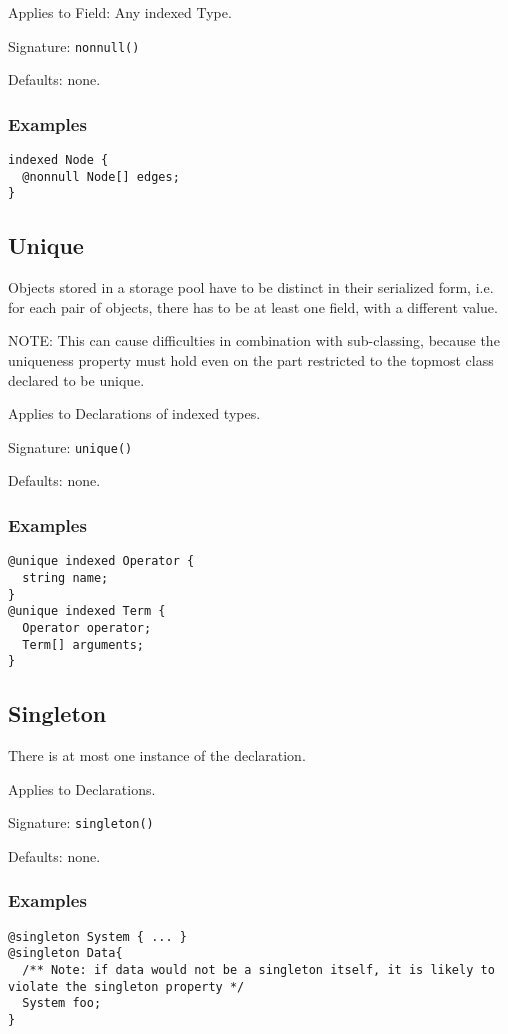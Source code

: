 \documentclass[a4paper,10pt]{article}
\begin{document}
Applies to Field: Any indexed Type.

Signature: \verb/nonnull()/

Defaults: none.

\subsubsection*{Examples}
\begin{verbatim}
indexed Node {
  @nonnull Node[] edges;
}
\end{verbatim}


\subsection*{Unique}
Objects stored in a storage pool have to be distinct in their serialized form, i.e. for each pair of objects, there has to be at least one field, with a different value.

NOTE: This can cause difficulties in combination with sub-classing, because the uniqueness property must hold even on the part restricted to the topmost class declared to be unique.

Applies to Declarations of indexed types.

Signature: \verb/unique()/

Defaults: none.

\subsubsection*{Examples}

\begin{verbatim}
@unique indexed Operator {
  string name;
}
@unique indexed Term {
  Operator operator;
  Term[] arguments;
}
\end{verbatim}


\subsection*{Singleton}
There is at most one instance of the declaration.

Applies to Declarations.

Signature: \verb/singleton()/

Defaults: none.

\subsubsection*{Examples}

\begin{verbatim}
@singleton System { ... }
@singleton Data{
  /** Note: if data would not be a singleton itself, it is likely to violate the singleton property */
  System foo;
}
\end{verbatim}
\end{document}
